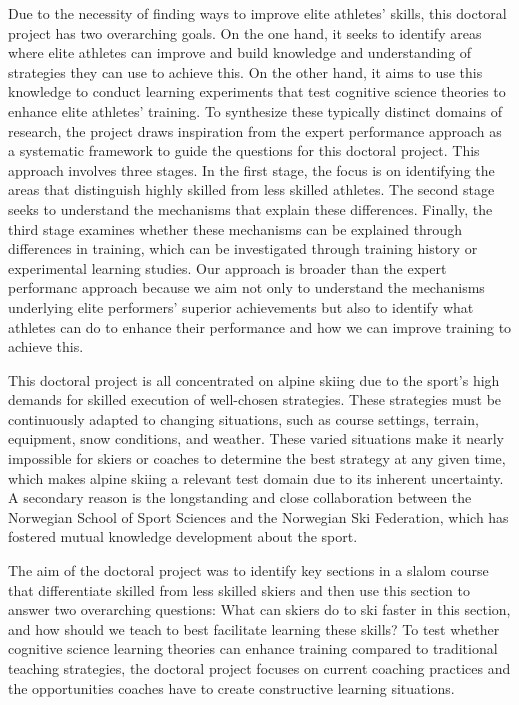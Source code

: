 Due to the necessity of finding ways to improve elite athletes' skills, this doctoral project has two overarching goals. On the one hand, it seeks to identify areas where elite athletes can improve and build knowledge and understanding of strategies they can use to achieve this. On the other hand, it aims to use this knowledge to conduct learning experiments that test cognitive science theories to enhance elite athletes' training. To synthesize these typically distinct domains of research, the project draws inspiration from the expert performance approach as a systematic framework to guide the questions for this doctoral project. This approach involves three stages. In the first stage, the focus is on identifying the areas that distinguish highly skilled from less skilled athletes. The second stage seeks to understand the mechanisms that explain these differences. Finally, the third stage examines whether these mechanisms can be explained through differences in training, which can be investigated through training history or experimental learning studies. Our approach is broader than the expert performanc approach because we aim not only to understand the mechanisms underlying elite performers' superior achievements but also to identify what athletes can do to enhance their performance and how we can improve training to achieve this. 

This doctoral project is all concentrated on alpine skiing due to the sport's high demands for skilled execution of well-chosen strategies. These strategies must be continuously adapted to changing situations, such as course settings, terrain, equipment, snow conditions, and weather. These varied situations make it nearly impossible for skiers or coaches to determine the best strategy at any given time, which makes alpine skiing a relevant test domain due to its inherent uncertainty. A secondary reason is the longstanding and close collaboration between the Norwegian School of Sport Sciences and the Norwegian Ski Federation, which has fostered mutual knowledge development about the sport.

The aim of the doctoral project was to identify key sections in a slalom course that differentiate skilled from less skilled skiers and then use this section to answer two overarching questions: What can skiers do to ski faster in this section, and how should we teach to best facilitate learning these skills? To test whether cognitive science learning theories can enhance training compared to traditional teaching strategies, the doctoral project focuses on current coaching practices and the opportunities coaches have to create constructive learning situations. 

